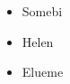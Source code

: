 \documentclass{article}
\begin{document}
	\begin{itemize}
		\item Somebi
		\item Helen
		\item Elueme
	\end{itemize}
\end{document}
